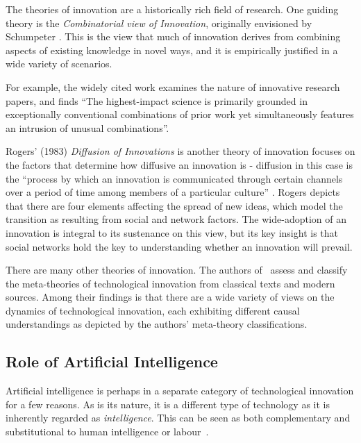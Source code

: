 The theories of innovation are a historically rich field of research. One guiding theory is the \emph{Combinatorial view of Innovation}, originally envisioned by Schumpeter \cite{croitoru_2017_SchumpeterJoseph}.
This is the view that much of innovation derives from combining aspects of existing knowledge in novel ways, and it is empirically justified in a wide variety of scenarios.

For example, the widely cited work \cite{uzzi_2013_AtypicalCombinations} examines the nature of innovative research papers, and finds ``The highest-impact science is primarily grounded in exceptionally conventional combinations of prior work yet simultaneously features an intrusion of unusual combinations''.

Rogers' (1983) \emph{Diffusion of Innovations} is another theory of innovation focuses on the factors that determine how diffusive an innovation is - diffusion in this case is the ``process by which an innovation is communicated through certain channels over a period of time among members of a particular culture'' \cite{rogers_1983_DiffusionInnovations}.
Rogers depicts that there are four elements affecting the spread of new ideas, which model the transition as resulting from social and network factors. The wide-adoption of an innovation is integral to its sustenance on this view, but its key insight is that social networks hold the key to understanding whether an innovation will prevail.

There are many other theories of innovation. The authors of~\cite{wei_2023_MetaTheories} assess and classify the meta-theories of technological innovation from classical texts and modern sources.
Among their findings is that there are a wide variety of views on the dynamics of technological innovation, each exhibiting different causal understandings as depicted by the authors' meta-theory classifications.

\subsection{Role of Artificial Intelligence}

Artificial intelligence is perhaps in a separate category of technological innovation for a few reasons.
As is its nature, it is a different type of technology as it is inherently regarded as \emph{intelligence}. This can be seen as both complementary and substitutional to human intelligence or labour~\textcolor{red}{\cite{TODO}}.

